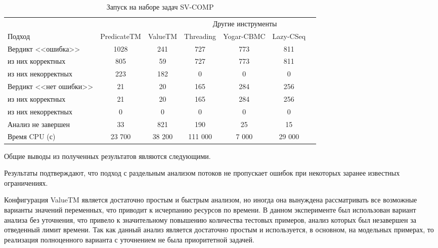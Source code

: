 \begin{center}
  \begin{table}[h]\footnotesize \centering
  	\label{table-sv-comp-tools}
    \caption{Запуск на наборе задач SV-COMP}
    \begin{tabular}{ | l | c | c | c | c | c | c |}
      \hline
      		& 		\multicolumn{2}{c|}{\theory} & \multicolumn{3}{c|}{Другие инструменты}  \\
      Подход         				& PredicateTM   & ValueTM 	& Threading & Yogar-CBMC 	& Lazy-CSeq  \\ \hline
      Вердикт <<ошибка>> 			& 1028    		& 241       & 727      	& 773       	& 811       \\ 
  \hspace{0.5cm} из них корректных 	& 805 			& 59 		& 727      	& 773       	& 811       \\ 
  \hspace{0.5cm} из них некорректных & 223 			& 182 		& 0    		& 0       		& 0          \\ \hline
      Вердикт <<нет ошибки>>  		& 21      		& 20        & 165       & 284        	& 256     \\ 
  \hspace{0.5cm} из них корректных 	& 21 			& 20    	& 165       & 284        	& 256       \\
  \hspace{0.5cm} из них некорректных & 0 			& 0    		& 0       	& 0         	& 0        \\ \hline
      Анализ не завершен       		& 33     		& 821       & 190      	& 25        	& 15      \\ \hline
      Время CPU (с)   				& 23 700 		& 38 200    & 111 000  	& 7 000    		& 29 000    \\ 
      \hline
    \end{tabular}
  \end{table}
\end{center}

Общие выводы из полученных результатов являются следующими.

Результаты подтверждают, что подход с раздельным анализом потоков не пропускает ошибок при некоторых заранее известных ограничениях.

Конфигурация ValueTM является достаточно простым и быстрым анализом, но иногда она вынуждена рассматривать все возможные варианты значений переменных, что приводит к исчерпанию ресурсов по времени.
В данном эксперименте был использован вариант анализа без уточнения, что привело к значительному повышению количества тестовых примеров, анализ которых был незавершен за отведенный лимит времени. 
Так как данный анализ является достаточно простым и используется, в основном, на модельных примерах, то реализация полноценного варианта с уточнением не была приоритетной задачей.


